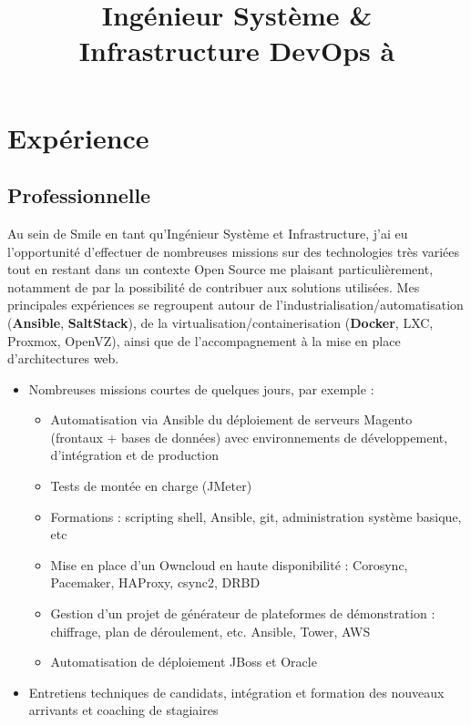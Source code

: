 \documentclass[10pt,a4paper]{moderncv}
\title{Ingénieur Système \& Infrastructure\newline
DevOps à \Colorhref{http://www.smile.fr/}{Smile Open Source Solutions}}
\begin{document}
\makecvtitle

\section{Expérience}

\subsection{Professionnelle}

{Au sein de Smile en tant qu'Ingénieur Système et Infrastructure, j'ai eu
l'opportunité d'effectuer de nombreuses missions sur des technologies très
variées tout en restant dans un contexte Open Source me plaisant
particulièrement, notamment de par la possibilité de contribuer aux solutions
utilisées.\newline
Mes principales  expériences  se  regroupent  autour  de
l'industrialisation/automatisation (\textbf{Ansible}, \textbf{SaltStack}), de
la virtualisation/containerisation (\textbf{Docker}, LXC, Proxmox, OpenVZ),
ainsi que de l'accompagnement à la mise en place d'architectures web.
  \begin{itemize}
    \item Nombreuses missions courtes de quelques jours, par exemple :
      \begin{itemize}
        \item Automatisation via Ansible du déploiement de serveurs Magento
          (frontaux + bases de données) avec environnements de développement,
          d'intégration et de production
        \item Tests de montée en charge (JMeter)
        \item Formations : scripting shell, Ansible, git, administration
          système basique, etc
        \item Mise en place d'un Owncloud en haute disponibilité : Corosync,
          Pacemaker, HAProxy, csync2, DRBD
        \item Gestion d'un projet de générateur de plateformes de démonstration
          : chiffrage, plan de déroulement, etc. Ansible, Tower, AWS
        \item Automatisation de déploiement JBoss et Oracle
      \end{itemize}
    \item Entretiens techniques de candidats, intégration et formation des
      nouveaux arrivants et coaching de stagiaires

\end{itemize}}
\end{document}
